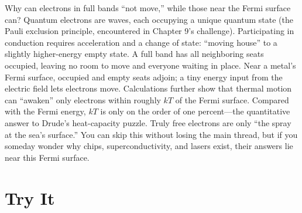 \begin{tiaozhan}
Why can electrons in full bands ``not move,'' while those near the Fermi surface can? Quantum electrons are waves, each occupying a unique quantum state (the Pauli exclusion principle, encountered in Chapter 9's challenge). Participating in conduction requires acceleration and a change of state: ``moving house'' to a slightly higher-energy empty state. A full band has all neighboring seats occupied, leaving no room to move and everyone waiting in place. Near a metal's Fermi surface, occupied and empty seats adjoin; a tiny energy input from the electric field lets electrons move. Calculations further show that thermal motion can ``awaken'' only electrons within roughly $kT$ of the Fermi surface. Compared with the Fermi energy, $kT$ is only on the order of one percent---the quantitative answer to Drude's heat-capacity puzzle. Truly free electrons are only ``the spray at the sea's surface.'' You can skip this without losing the main thread, but if you someday wonder why chips, superconductivity, and lasers exist, their answers lie near this Fermi surface.
\end{tiaozhan}

\section*{Try It}

